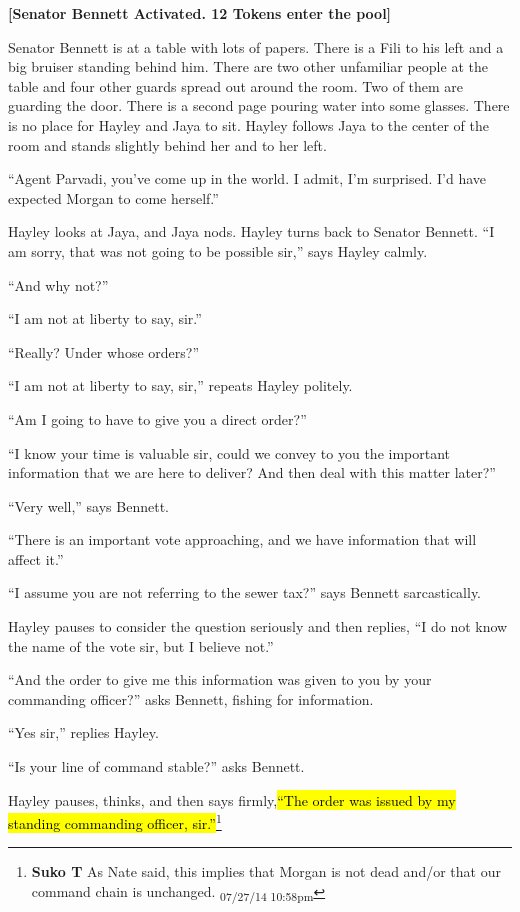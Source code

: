 \textbf{{[}Senator Bennett Activated. 12 Tokens enter the pool{]}}



Senator Bennett is at a table with lots of papers.  There is a Fili to his left and a big bruiser standing behind him.  There are two other unfamiliar people at the table and four other guards spread out around the room.  Two of them are guarding the door.  There is a second page pouring water into some glasses.  There is no place for Hayley and Jaya to sit.  Hayley follows Jaya to the center of the room and stands slightly behind her and to her left.



``Agent Parvadi, you've come up in the world.  I admit, I'm surprised.  I'd have expected Morgan to come herself.''

Hayley looks at Jaya, and Jaya nods. Hayley turns back to Senator Bennett.  ``I am sorry, that was not going to be possible sir,'' says Hayley calmly.

``And why not?''

``I am not at liberty to say, sir.''

``Really?  Under whose orders?''

``I am not at liberty to say, sir,'' repeats Hayley politely.

``Am I going to have to give you a direct order?''

``I know your time is valuable sir, could we convey to you the important information that we are here to deliver?  And then deal with this matter later?''

``Very well,'' says Bennett.

``There is an important vote approaching, and we have information that will affect it.''

``I assume you are not referring to the sewer tax?'' says Bennett sarcastically.

Hayley pauses to consider the question seriously and then replies, ``I do not know the name of the vote sir, but I believe not.''

``And the order to give me this information was given to you by your commanding officer?'' asks Bennett, fishing for information.

``Yes sir,'' replies Hayley.

``Is your line of command stable?'' asks Bennett.

Hayley pauses, thinks, and then says firmly,\hl{``The order was issued by my standing commanding officer, sir.''}\footnote{\textbf{Suko T }As Nate said, this implies that Morgan is not dead and/or that our command chain is unchanged. \textsubscript{07/27/14 10:58pm}}

